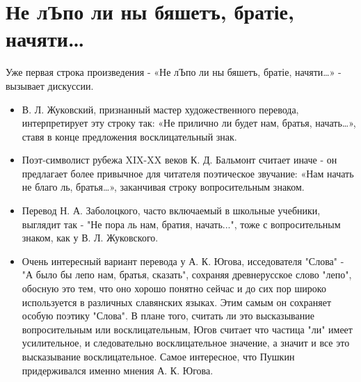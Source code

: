 \documentclass[14pt, a4paper]{article}
\begin{document}
\section{Не лЪпо ли ны бяшетъ, бра­тіе, начяти…}
\par Уже первая строка произведения - «Не лЪпо ли ны бяшетъ, бра­тіе, начяти…» - вызывает дискуссии. 
\begin{itemize}
  \item В. Л. Жуковский, признанный мастер художественного перевода, интерпретирует эту строку так: «Не прилично ли будет нам, братья, начать…», ставя в конце предложения восклицательный знак. 
  \item Поэт-символист рубежа XIX-XX веков К. Д. Бальмонт считает иначе - он предлагает более привычное для читателя поэтическое звучание: «Нам начать не благо ль, братья…», заканчивая строку вопросительным знаком.
  \item Перевод Н. А. Заболоцкого, часто включаемый в школьные учебники, выглядит так - "Не пора ль нам, братия, начать...", тоже с вопросительным знаком, как у В. Л. Жуковского.
  \item Очень интересный вариант перевода у А. К. Югова, исседователя "Слова" - "А было бы лепо нам, братья, сказать", сохраняя древнерусское слово "лепо", обосную это тем, что оно хорошо понятно сейчас и до сих пор широко используется в различных славянских языках. Этим самым он сохраняет особую поэтику "Слова". В плане того, считать ли это высказывание вопросительным или восклицательным, Югов считает что частица "ли" имеет усилительное, и следовательно восклицательное значение, а значит и все это высказывание восклицательное. Самое интересное, что Пушкин придерживался именно мнения А. К. Югова.
\end{itemize}
\end{document}
